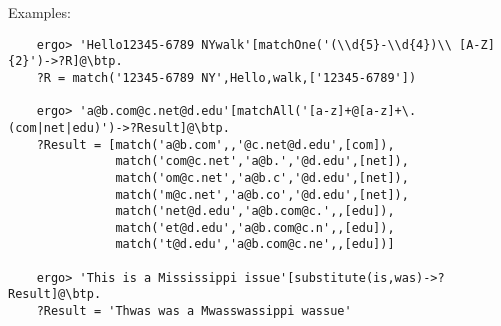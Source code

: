 Examples:
{\small
\begin{verbatim}
    ergo> 'Hello12345-6789 NYwalk'[matchOne('(\\d{5}-\\d{4})\\ [A-Z]{2}')->?R]@\btp.
    ?R = match('12345-6789 NY',Hello,walk,['12345-6789'])

    ergo> 'a@b.com@c.net@d.edu'[matchAll('[a-z]+@[a-z]+\.(com|net|edu)')->?Result]@\btp.
    ?Result = [match('a@b.com',,'@c.net@d.edu',[com]),
               match('com@c.net','a@b.','@d.edu',[net]),
               match('om@c.net','a@b.c','@d.edu',[net]),
               match('m@c.net','a@b.co','@d.edu',[net]),
               match('net@d.edu','a@b.com@c.',,[edu]),
               match('et@d.edu','a@b.com@c.n',,[edu]),
               match('t@d.edu','a@b.com@c.ne',,[edu])]

    ergo> 'This is a Mississippi issue'[substitute(is,was)->?Result]@\btp.
    ?Result = 'Thwas was a Mwasswassippi wassue'
\end{verbatim}
  }



